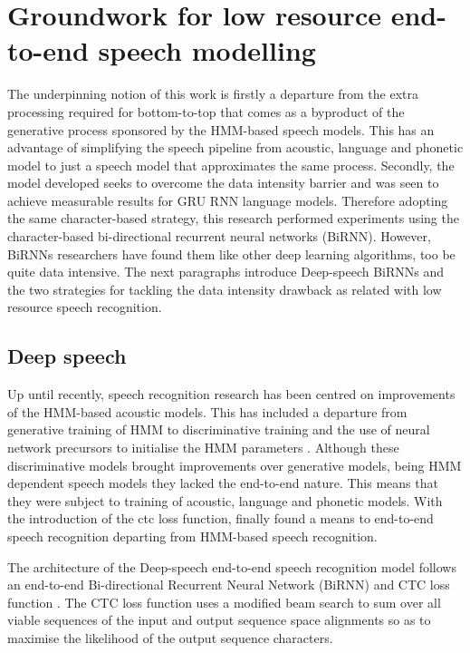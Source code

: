 \section{Groundwork for low resource end-to-end speech modelling}
The underpinning notion of this work is firstly a departure from the extra processing required for  bottom-to-top that comes as a byproduct of the generative process sponsored by the HMM-based speech models. This has an advantage of simplifying the speech pipeline from acoustic, language and phonetic model to just a speech model that approximates the same process.  Secondly, the model developed seeks to overcome the data intensity barrier and was seen to achieve measurable results for GRU RNN language models.  Therefore adopting the same character-based strategy, this research performed experiments using the character-based bi-directional recurrent neural networks (BiRNN).  However, BiRNNs researchers have found them like other deep learning algorithms, too be quite data intensive\cite{hannun2014deep}.  The next paragraphs introduce Deep-speech BiRNNs and the two strategies for tackling the data intensity drawback as related with low resource speech recognition.

\subsection{Deep speech}
Up until recently, speech recognition research has been centred on improvements of the HMM-based acoustic models.  This has included a departure from generative training of HMM to discriminative training \citep{woodland2000large} and the use of neural network precursors to initialise the HMM parameters \citep{mohamed2012acoustic}.  Although these  discriminative models brought improvements over generative models, being HMM dependent speech models they lacked the end-to-end nature.  This means that they were subject to training of acoustic, language and phonetic models.  With the introduction of the \acrfull{ctc} loss  function, \cite{graves2014towards} finally found a means to end-to-end speech recognition departing from HMM-based speech recognition. 

The architecture of the Deep-speech end-to-end speech recognition model \citep{hannun2014first} follows an end-to-end Bi-directional Recurrent Neural Network (BiRNN) and CTC loss function \citep{graves2006connectionist}.  The CTC loss function uses a modified beam search to sum over all viable sequences of the input and output sequence space alignments so as to maximise the likelihood of the output sequence characters.

